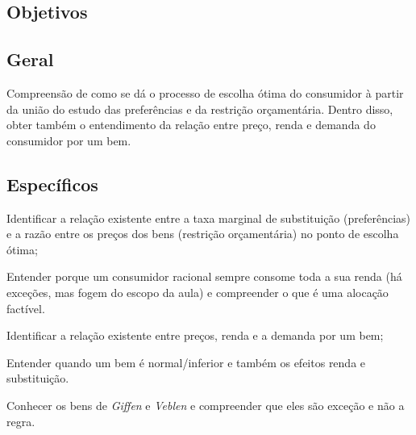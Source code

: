 \documentclass[
	article,			%
	12pt,				%
	twoside,			%
	a4paper,			%
	section=TITLE,		%
	english,			%
	brazil,				%
	sumario=tradicional
]{abntex2-modelo-plano-de-aula}
\begin{document}

\frenchspacing 



\imprimirletterUFSC





\textual
\pagestyle{notasUFSC}



\begin{snugshade}
	\section{\textbf{Objetivos}} %
\end{snugshade}

\subsection{Geral} %

Compreensão de como se dá o processo de escolha ótima do consumidor à partir da união do estudo das preferências e da restrição orçamentária. Dentro disso, obter também o entendimento da relação entre preço, renda e demanda do consumidor por um bem.

\subsection{Específicos} %

\begin{outline}
	
	\1 Identificar a relação existente entre a taxa marginal de substituição (preferências) e a razão entre os preços dos bens (restrição orçamentária) no ponto de escolha ótima;
	
	\2 Entender porque um consumidor racional sempre consome toda a sua renda (há exceções, mas fogem do escopo da aula) e compreender o que é uma alocação factível.
	
	\1 Identificar a relação existente entre preços, renda e a demanda por um bem;
	
	\2 Entender quando um bem é normal/inferior e também os efeitos renda e substituição.
	
	\2 Conhecer os bens de \textit{Giffen} e \textit{Veblen} e compreender que eles são exceção e não a regra.

\end{outline}%
\end{document}
